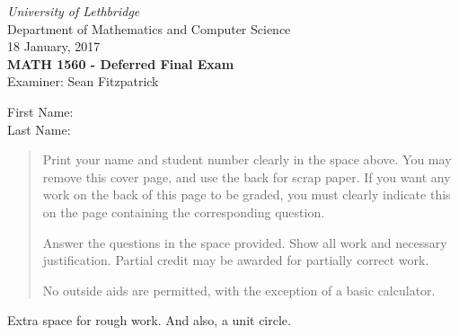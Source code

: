 \documentclass[12pt]{article}
\newcommand{\skipline}{\vspace{12pt}}
\begin{document}
\author{Instructor: Sean Fitzpatrick}
\thispagestyle{plain}
\begin{center}
\emph{University of Lethbridge}\\
Department of Mathematics and Computer Science\\
18 January, 2017\\
{\bf MATH 1560 - Deferred Final Exam}\\
Examiner: Sean Fitzpatrick
\end{center}
\skipline \skipline \skipline \noindent \skipline
First Name:\underline{\hspace{348pt}}\\

\skipline \skipline \skipline \noindent \skipline
Last Name:\underline{\hspace{350pt}}\\


\skipline
\skipline



\vspace{0.1in}

\vspace*{\fill}

\begin{quote}
Print your name and student number clearly in the space above. You may remove this cover page, and use the back for scrap paper. If you want any work on the back of this page to be graded, you must clearly indicate this on the page containing the corresponding question.

\medskip

Answer the questions in the space provided. Show all work and necessary justification. Partial credit may be awarded for partially correct work.
 
\medskip

No outside aids are permitted, with the exception of a basic calculator. 
\end{quote}



\newpage

Extra space for rough work. And also, a unit circle.

\vspace*{\fill}
\end{document}
